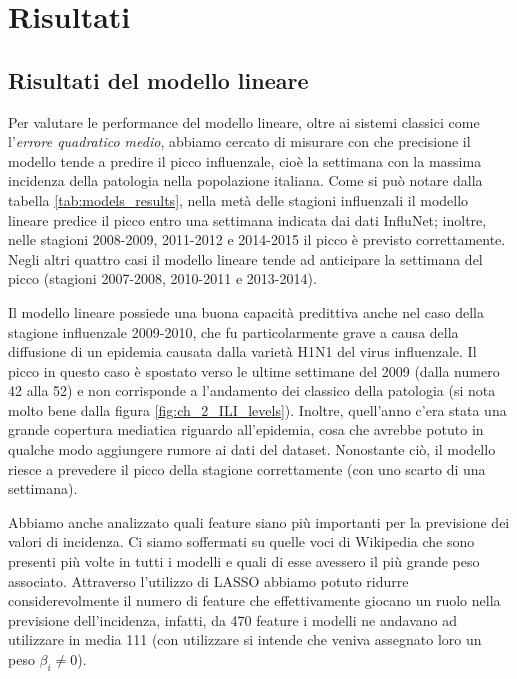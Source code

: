 \chapter{Risultati}
\bigskip

\section{Risultati del modello lineare}
\bigskip

Per valutare le performance del modello lineare, oltre ai sistemi classici come l'\textit{errore quadratico medio}, abbiamo 
cercato di misurare con che precisione il modello tende a predire il picco influenzale, cioè la settimana con la massima 
incidenza della patologia nella popolazione italiana. Come si può notare dalla tabella \ref{tab:models_results}, nella metà 
delle stagioni influenzali il modello lineare predice il picco entro una settimana indicata dai dati InfluNet; inoltre, nelle 
stagioni 2008-2009, 2011-2012 e 2014-2015 il picco è previsto correttamente. Negli altri quattro casi il modello lineare 
tende ad anticipare la settimana del picco (stagioni 2007-2008, 2010-2011 e 2013-2014).
\bigskip

Il modello lineare possiede una buona capacità predittiva anche nel caso della stagione influenzale 2009-2010, che fu 
particolarmente grave a causa della diffusione di un epidemia causata dalla varietà H1N1 del virus influenzale. Il picco in 
questo caso è spostato verso le ultime settimane del 2009 (dalla numero 42 alla 52) e non corrisponde a l'andamento dei 
classico della patologia (si nota molto bene dalla figura \ref{fig:ch_2_ILI_levels}). Inoltre, quell'anno c'era stata una 
grande copertura mediatica riguardo all'epidemia, cosa che avrebbe potuto in qualche modo aggiungere rumore ai dati del 
dataset. Nonostante ciò, il modello riesce a prevedere il picco della stagione correttamente (con uno scarto di una 
settimana).
\bigskip

Abbiamo anche analizzato quali feature siano più importanti per la previsione dei valori di incidenza. Ci siamo soffermati su 
quelle voci di Wikipedia che sono presenti più volte in tutti i modelli e quali di esse avessero il più grande peso 
associato. Attraverso l'utilizzo di LASSO abbiamo potuto ridurre considerevolmente il numero di feature che effettivamente 
giocano un ruolo nella previsione dell'incidenza, infatti, da 470 feature i modelli ne andavano 
ad utilizzare in media 111 (con utilizzare si intende che veniva assegnato loro un peso $\beta_i \neq 0$). 
\bigskip

